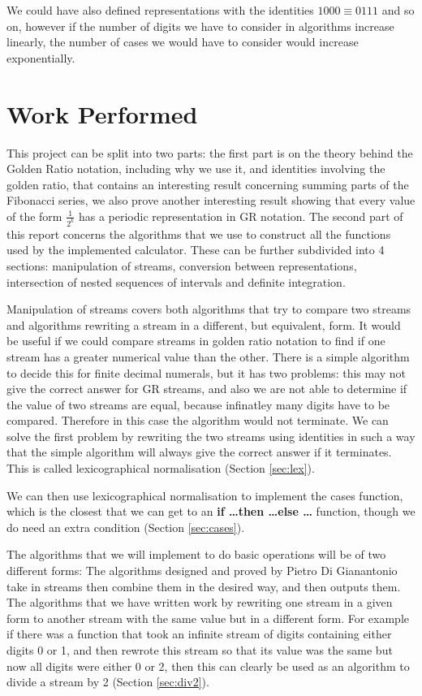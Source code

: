 \documentclass{cs4rep}
\begin{document}
We could have also defined representations with the identities
$1000\equiv0111$ and so on, however if the number of digits we have to
consider in algorithms increase linearly, the number of cases we would
have to consider would increase exponentially.


\section{Work Performed}
This project can be split into two parts: the first part is on the
theory behind the Golden Ratio notation, including why we use it, and
identities involving the golden ratio, that contains an interesting
result concerning summing parts of the Fibonacci series, we also prove
another interesting result showing that every value of the form
$\frac{1}{2^{k}}$ has a periodic representation in GR notation.  The
second part of this report concerns the algorithms that we use to
construct all the functions used by the implemented calculator. These can
be further subdivided into 4 sections: manipulation of streams,
conversion between representations, intersection of nested sequences
of intervals and definite integration.  

Manipulation of streams covers both algorithms that try to compare two
streams and algorithms rewriting a stream in a different, but equivalent, form.
It would be useful if we could compare streams in golden ratio
notation to find if one stream has a greater numerical value than the
other. There is a simple algorithm to decide this for finite decimal numerals,
but it has two problems: this may not give the correct answer for
GR streams, and also we are not able to determine if the
value of two streams are equal, because infinatley many digits have to
be compared. Therefore in this case the algorithm would not terminate.
We can solve the first problem by rewriting the two streams using
identities in such a way that the simple algorithm will always give
the correct answer if it terminates. This is called lexicographical
normalisation (Section \ref{sec:lex}).

We can then use lexicographical normalisation to implement the cases
function, which is the closest that we can get to an {\bf
  if \ldots then \ldots else \ldots} function, though we do need an
extra condition (Section \ref{sec:cases}).

The algorithms that we will implement to do basic operations will be of
two different forms: The algorithms designed and proved by Pietro Di
Gianantonio take in streams then combine them in the desired way, and
then outputs them. The algorithms that we have written
work by rewriting one stream in a given form to another stream with
the same value but in a different form. For example if there was a
function that took an infinite stream of digits containing either
digits 0 or 1, and then rewrote this stream so that its value was the
same but now all digits were either 0 or 2, then this can clearly be
used as an algorithm to divide a stream by 2 (Section \ref{sec:div2}).
\end{document}
